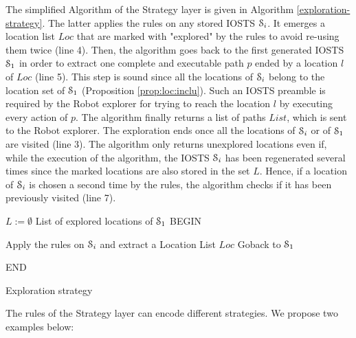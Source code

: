 The simplified Algorithm of the Strategy layer is given in
Algorithm \ref{exploration-strategy}. The latter applies the
rules on any stored IOSTS $\EuScript{S}_i$. It emerges a
location list $Loc$ that are marked with "explored" by the rules
to avoid re-using them twice (line 4). Then, the algorithm goes
back to the first generated IOSTS $\EuScript{S}_1$ in order to
extract one complete and executable path $p$ ended by a location
$l$ of $Loc$ (line 5). This step is sound since all the locations
of $\EuScript{S}_i$ belong to the location set of
$\EuScript{S}_1$ (Proposition \ref{prop:loc:inclu}). Such an
IOSTS preamble is required by the Robot explorer for trying to
reach the location $l$ by executing every action of $p$. The
algorithm finally returns a list of paths $List$, which is sent
to the Robot explorer. The exploration ends once all the
locations of $\EuScript{S}_i$ or of $\EuScript{S}_1$ are visited
(line 3). The algorithm only returns unexplored locations even
if, while the execution of the algorithm, the IOSTS
$\EuScript{S}_i$ has been regenerated several times since the
marked locations are also stored in the set $L$. Hence, if a
location of $\EuScript{S}_i$ is chosen a second time by the
rules, the algorithm checks if it has been previously visited
(line 7).

\begin{algorithm}
 


$L:=\emptyset$ List of explored locations of $\EuScript{S}_1$\;
BEGIN\;
{
Apply the rules on $\EuScript{S}_i$ and extract a  Location List $Loc$\;
Goback to $\EuScript{S}_1$\;

}
END\;

\caption{Exploration strategy}
\label{exploration-strategy}
\end{algorithm}

The rules of the Strategy layer can encode different strategies.
We propose two examples below:

